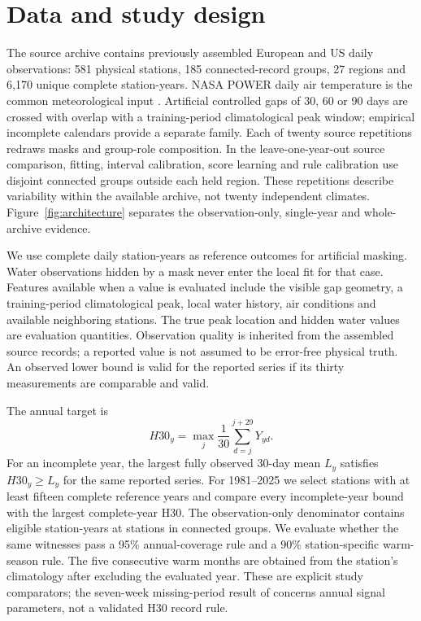 \documentclass[draft,linenumbers]{agujournal2025}
\begin{document}
\section{Data and study design}
The source archive contains previously assembled European and US daily observations: 581 physical stations, 185 connected-record groups, 27 regions and 6,170 unique complete station-years. NASA POWER daily air temperature is the common meteorological input \cite{nasapower2026}. Artificial controlled gaps of 30, 60 or 90 days are crossed with overlap with a training-period climatological peak window; empirical incomplete calendars provide a separate family. Each of twenty source repetitions redraws masks and group-role composition. In the leave-one-year-out source comparison, fitting, interval calibration, score learning and rule calibration use disjoint connected groups outside each held region. These repetitions describe variability within the available archive, not twenty independent climates. Figure~\ref{fig:architecture} separates the observation-only, single-year and whole-archive evidence.

We use complete daily station-years as reference outcomes for artificial masking. Water observations hidden by a mask never enter the local fit for that case. Features available when a value is evaluated include the visible gap geometry, a training-period climatological peak, local water history, air conditions and available neighboring stations. The true peak location and hidden water values are evaluation quantities. Observation quality is inherited from the assembled source records; a reported value is not assumed to be error-free physical truth. An observed lower bound is valid for the reported series if its thirty measurements are comparable and valid.

The annual target is
\begin{equation}
 H30_y=\max_{j}\frac{1}{30}\sum_{d=j}^{j+29}Y_{yd}.
\end{equation}
For an incomplete year, the largest fully observed 30-day mean $L_y$ satisfies $H30_y\ge L_y$ for the same reported series. For 1981--2025 we select stations with at least fifteen complete reference years and compare every incomplete-year bound with the largest complete-year H30. The observation-only denominator contains \CCEligibleYears{} eligible station-years at \CCEligibleStations{} stations in \CCEligibleGroups{} connected groups. We evaluate whether the same witnesses pass a 95\% annual-coverage rule and a 90\% station-specific warm-season rule. The five consecutive warm months are obtained from the station's climatology after excluding the evaluated year. These are explicit study comparators; the seven-week missing-period result of  concerns annual signal parameters, not a validated H30 record rule.
\end{document}
